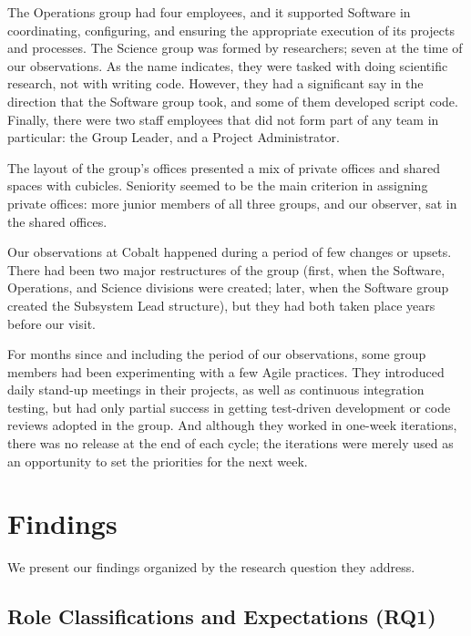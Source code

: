 \documentclass[10pt, conference, compsocconf]{IEEEtran}
\begin{document}
The Operations group had four employees, and it supported Software in coordinating, configuring, and ensuring the appropriate execution of its projects and processes. The Science group was formed by researchers; seven at the time of our observations. As the name indicates, they were tasked with doing scientific research, not with writing code. However, they had a significant say in the direction that the Software group took, and some of them developed script code. Finally, there were two staff employees that did not form part of any team in particular: the Group Leader, and a Project Administrator.

The layout of the group's offices presented a mix of private offices and shared spaces with cubicles. Seniority seemed to be the main criterion in assigning private offices: more junior members of all three groups, and our observer, sat in the shared offices.

Our observations at Cobalt happened during a period of few changes or upsets. There had been two major restructures of the group (first, when the Software, Operations, and Science divisions were created; later, when the Software group created the Subsystem Lead structure), but they had both taken place years before our visit.

For months since and including the period of our observations, some group members had been experimenting with a few Agile practices. They introduced daily stand-up meetings in their projects, as well as continuous integration testing, but had only partial success in getting test-driven development or code reviews adopted in the group. And although they worked in one-week iterations, there was no release at the end of each cycle; the iterations were merely used as an opportunity to set the priorities for the next week.




\section{Findings}

We present our findings organized by the research question they address.

\subsection{Role Classifications and Expectations (RQ1)}
\end{document}
